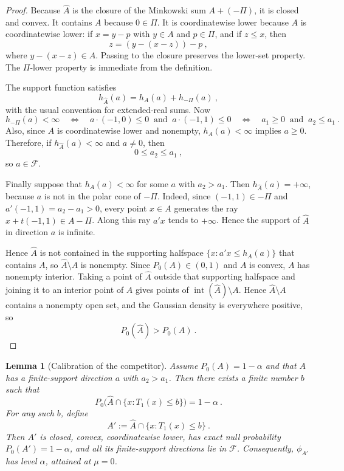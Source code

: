\documentclass[12pt]{article}
\newtheorem{lemma}{Lemma}
\theoremstyle{remark}
\begin{document}
\begin{proof}
Because $\widehat A$ is the closure of the Minkowski sum $A+(-\Pi)$, it is closed and convex.  It contains $A$ because $0\in\Pi$.  It is coordinatewise lower because $A$ is coordinatewise lower: if $x=y-p$ with $y\in A$ and $p\in\Pi$, and if $z\le x$, then
\[
z=(y-(x-z))-p~,
\]
where $y-(x-z)\in A$.  Passing to the closure preserves the lower-set property.  The $\Pi$-lower property is immediate from the definition.

The support function satisfies
\[
h_{\widehat A}(a)=h_A(a)+h_{-\Pi}(a)~,
\]
with the usual convention for extended-real sums.  Now
\[
h_{-\Pi}(a)<\infty
\quad\Longleftrightarrow\quad
 a\cdot(-1,0)\le0\ \text{ and }\ a\cdot(-1,1)\le0
\quad\Longleftrightarrow\quad
 a_1\ge0\ \text{ and }\ a_2\le a_1~.
\]
Also, since $A$ is coordinatewise lower and nonempty, $h_A(a)<\infty$ implies $a\ge0$.  Therefore, if $h_{\widehat A}(a)<\infty$ and $a\ne0$, then
\[
0\le a_2\le a_1~,
\]
so $a\in\mathcal F$.

Finally suppose that $h_A(a)<\infty$ for some $a$ with $a_2>a_1$.  Then $h_{\widehat A}(a)=+\infty$, because $a$ is not in the polar cone of $-\Pi$.  Indeed, since \((-1,1)\in-\Pi\) and
\(a'(-1,1)=a_2-a_1>0\), every point \(x\in A\) generates the ray
\(x+t(-1,1)\in A-\Pi\). Along this ray \(a'x\) tends to \(+\infty\).
Hence the support of \(\widehat A\) in direction \(a\) is infinite.


Hence $\widehat A$ is not contained in the supporting halfspace $\{x:a'x\le h_A(a)\}$ that contains $A$, so $\widehat A\setminus A$ is nonempty.  Since $P_0(A)\in(0,1)$ and $A$ is convex, $A$ has nonempty interior.  Taking a point of $\widehat A$ outside that supporting halfspace and joining it to an interior point of $A$ gives points of $\operatorname{int}(\widehat A)\setminus A$.  Hence $\widehat A\setminus A$ contains a nonempty open set, and the Gaussian density is everywhere positive, so
\[
P_0(\widehat A)>P_0(A)~.
\]
\end{proof}

\begin{lemma}[Calibration of the competitor]\label{lem:competitor}
Assume $P_0(A)=1-\alpha$ and that $A$ has a finite-support direction $a$ with $a_2>a_1$.  Then there exists a finite number $b$ such that
\[
P_0\big(\widehat A\cap\{x:T_1(x)\le b\}\big)=1-\alpha~.
\]
For any such $b$, define
\[
A':=\widehat A\cap\{x:T_1(x)\le b\}~.
\]
Then $A'$ is closed, convex, coordinatewise lower, has exact null probability $P_0(A')=1-\alpha$, and all its finite-support directions lie in $\mathcal F$.  Consequently, $\phi_{A'}$ has level $\alpha$, attained at $\mu=0$.
\end{lemma}
\end{document}
